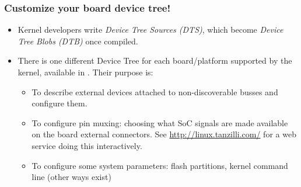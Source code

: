 \begin{frame}
  \frametitle{Customize your board device tree!}
  \begin{itemize}
  \item Kernel developers write {\em Device Tree Sources (DTS)},
    which become {\em Device Tree Blobs (DTB)} once compiled.
  \item There is one different Device Tree for each board/platform
    supported by the kernel, available in
    . Their purpose is:
    \begin{itemize}
    \item To describe external devices attached to non-discoverable
      busses and configure them.
    \item To configure pin muxing: choosing what SoC signals are
      made available on the board external connectors.
      See \url{http://linux.tanzilli.com/} for a web service doing this
      interactively.
    \item To configure some system parameters: flash partitions,
      kernel command line (other ways exist)
    \end{itemize}
  \end{itemize}
\end{frame}
